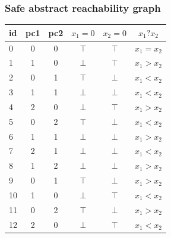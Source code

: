 \documentclass{beamer}
\begin{document}
\begin{frame}
{\begin{figure}
\begin{tikzpicture}[->,node distance=10mm, state/.style={draw}]
  \end{tikzpicture}
\end{figure}
}


\end{frame}

\begin{frame}
  \frametitle{Safe abstract reachability graph}

\begin{minipage}{0.65\linewidth}
{\small
\begin{tabular}{l|ccccc}
id & pc1 & pc2 & $x_1=0$ & $x_2=0$ & $x_1 ? x_2$ \\
\hline
0  & 0  &  0  &  $\top$ & $\top$ & $x_1 = x_2$ \\
1  & 1  &  0  &  $\bot$ & $\top$ & $x_1 > x_2$ \\
2  & 0  &  1  &  $\top$ & $\bot$ & $x_1 < x_2$ \\
3  & 1  &  1  &  $\bot$ & $\bot$ & $x_1 < x_2$ \\
4  & 2  &  0  &  $\bot$ & $\top$ & $x_1 > x_2$ \\
5  & 0  &  2  &  $\top$ & $\bot$ & $x_1 < x_2$ \\
6  & 1  &  1  &  $\bot$ & $\bot$ & $x_1 > x_2$ \\
7  & 2  &  1  &  $\bot$ & $\bot$ & $x_1 < x_2$ \\
8  & 1  &  2  &  $\bot$ & $\bot$ & $x_1 > x_2$ \\
9  & 0  &  1  &  $\top$ & $\bot$ & $x_1 > x_2$ \\
10 & 1  &  0  &  $\bot$ & $\top$ & $x_1 < x_2$ \\
11 & 0  &  2  &  $\top$ & $\bot$ & $x_1 > x_2$ \\
12 & 2  &  0  &  $\bot$ & $\top$ & $x_1 < x_2$
\end{tabular}
}
\end{minipage}
\begin{minipage}{0.3\linewidth}

\end{minipage}
\end{frame}
\end{document}
